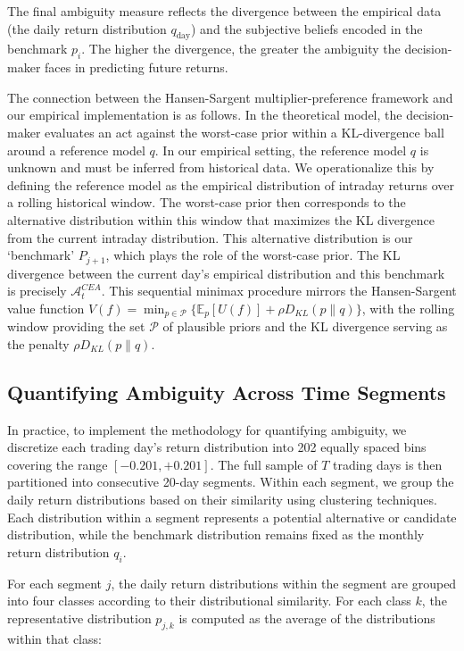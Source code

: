 \documentclass[preprint,12pt,authoryear]{elsarticle}
\renewcommand{\textcolor}[2]{\begingroup\color{#1}#2\endgroup}
\begin{document}
The final ambiguity measure reflects the divergence between the empirical data (the daily return distribution \(q_{\text{day}}\)) and the subjective beliefs encoded in the benchmark \(p_i\). The higher the divergence, the greater the ambiguity the decision-maker faces in predicting future returns.

\textcolor{red}{The connection between the Hansen-Sargent multiplier-preference framework and our empirical implementation is as follows. In the theoretical model, the decision-maker evaluates an act against the worst-case prior within a KL-divergence ball around a reference model $q$. In our empirical setting, the reference model $q$ is unknown and must be inferred from historical data. We operationalize this by defining the reference model as the empirical distribution of intraday returns over a rolling historical window. The worst-case prior then corresponds to the alternative distribution within this window that maximizes the KL divergence from the current intraday distribution. This alternative distribution is our `benchmark' $P_{j+1}$, which plays the role of the worst-case prior. The KL divergence between the current day's empirical distribution and this benchmark is precisely $\mathcal{A}^{CEA}_t$. This sequential minimax procedure mirrors the Hansen-Sargent value function $V(f) = \min_{p \in \mathcal{P}} \{\mathbb{E}_p[U(f)] + \rho D_{KL}(p\|q)\}$, with the rolling window providing the set $\mathcal{P}$ of plausible priors and the KL divergence serving as the penalty $\rho D_{KL}(p\|q)$.}

\subsection{Quantifying Ambiguity Across Time Segments}

In practice, to implement the methodology for quantifying ambiguity, we discretize each trading day's return distribution into 202 equally spaced bins covering the range \([-0.201, +0.201]\). The full sample of \(T\) trading days is then partitioned into consecutive 20-day segments. Within each segment, we group the daily return distributions based on their similarity using clustering techniques. Each distribution within a segment represents a potential alternative or candidate distribution, while the benchmark distribution remains fixed as the monthly return distribution \(q_i\).

For each segment \(j\), the daily return distributions within the segment are grouped into four classes according to their distributional similarity. For each class \(k\), the representative distribution \(p_{j,k}\) is computed as the average of the distributions within that class:
\end{document}
